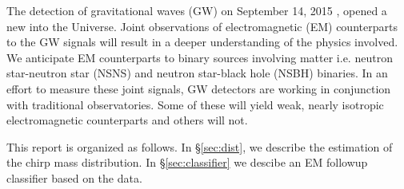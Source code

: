 The detection of gravitational waves (GW) on September 14, 2015 \parencite{2016PhRvL.116f1102A}, opened a new into the Universe. Joint observations of electromagnetic (EM) counterparts to the GW signals will result in a deeper understanding of the physics involved. We anticipate EM counterparts to binary sources involving matter i.e. neutron star-neutron star (NSNS) and neutron star-black hole (NSBH) binaries. In an effort to measure these joint signals, GW detectors are working in conjunction with traditional observatories. Some of these will yield weak, nearly isotropic electromagnetic counterparts and others will not.

This report is organized as follows. In \S\ref{sec:dist}, we describe the estimation of the chirp mass distribution. In \S\ref{sec:classifier} we descibe an EM followup classifier based on the data.
